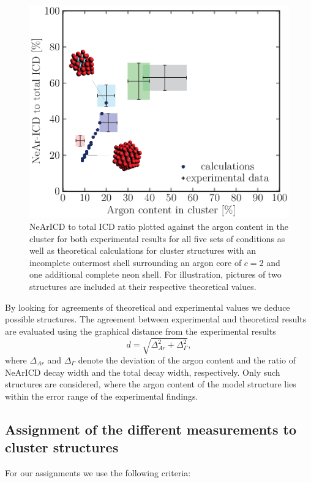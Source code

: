 \begin{figure}[!h]
  \centering
  \includegraphics[scale=0.75]{pics/incompl01_02_mit_inlays.eps}
  \caption{NeArICD to total ICD ratio plotted against the argon content
           in the cluster for both experimental results for all five sets of
           conditions as well as theoretical calculations for cluster structures
           with an incomplete outermost shell surrounding an argon core of
           $c=2$ and one additional complete neon shell. For illustration, pictures
					of two structures are included at their respective theoretical values.}
  \label{figure:incompl01_02_explain}
\end{figure}

By looking for agreements of theoretical and experimental values we deduce
possible structures.
The agreement between experimental and theoretical results are evaluated
using the graphical distance from the experimental results
\begin{equation}
  d = \sqrt{\Delta_{Ar}^2 + \Delta_{\Gamma}^2}    ,
\end{equation}
where $\Delta_{Ar}$ and $\Delta_{\Gamma}$ denote the deviation of the argon content
and the ratio of NeArICD decay width and the total decay width, respectively.
Only such structures are considered, where the argon content of the model
structure lies within the error range of the experimental findings.


\subsection{Assignment of the different measurements to cluster structures}
For our assignments we use the following criteria:

